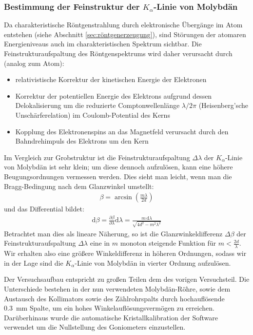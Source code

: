 \documentclass[11pt, a4paper]{article}
\begin{document}
\subsubsection{Bestimmung der Feinstruktur der $K_\alpha$-Linie von Molybdän}
Da charakteristische Röntgenstrahlung durch elektronische Übergänge im Atom entstehen (siehe Abschnitt \ref{sec:röntgenerzeugung}), sind Störungen der atomaren Energieniveaus auch im charakteristischen Spektrum sichtbar.
Die Feinstrukturaufspaltung des Röntgenspektrums wird daher verursacht durch (analog zum Atom):
\begin{itemize}
  \item relativistische Korrektur der kinetischen Energie der Elektronen
  
  \item Korrektur der potentiellen Energie des Elektrons aufgrund dessen Delokalisierung um die reduzierte Comptonwellenlänge $\lambda / 2\pi$ (Heisenberg'sche Unschärferelation) im Coulomb-Potential des Kerns
  
  \item Kopplung des Elektronenspins an das Magnetfeld verursacht durch den Bahndrehimpuls des Elektrons um den Kern
\end{itemize}
Im Vergleich zur Grobstruktur ist die Feinstrukturaufspaltung $\Delta \lambda$ der $K_\alpha$-Linie von Molybdän ist sehr klein; um diese dennoch aufzulösen, kann eine höhere Beugungsordnungen vermessen werden.
Dies sieht man leicht, wenn man die Bragg-Bedingung nach dem Glanzwinkel umstellt:
\begin{align}
  \beta = \arcsin \left( \frac{m \lambda}{2 d} \right)
\end{align}
und das Differential bildet:
\begin{align}
  \mathrm{d}\beta = \frac{\partial \beta}{\partial \lambda} \mathrm{d}\lambda = \frac{m\, \mathrm{d}\lambda}{\sqrt{4 d^2 - m^2 \lambda^2}}
\end{align}
Betrachtet man dies als lineare Näherung, so ist die Glanzwinkeldifferenz $\Delta \beta$ der Feinstrukturaufspaltung $\Delta \lambda$ eine in $m$ monoton steigende Funktion für $m < \frac{2d}{\lambda}$.
Wir erhalten also eine größere Winkeldifferenz in höheren Ordnungen, sodass wir in der Lage sind die $K_\alpha$-Linie von Molybdän in vierter Ordnung aufzulösen.

Der Versuchsaufbau entspricht zu großen Teilen dem des vorigen Versuchsteil.
Die Unterschiede bestehen in der nun verwendeten Molybdän-Röhre, sowie dem Austausch des Kollimators sowie des Zählrohrspalts durch hochauflösende \SI{0,3}{\milli\metre} Spalte, um ein hohes Winkelauflösungsvermögen zu erreichen.
Darüberhinaus wurde die automatische Kristallkalibration der Software verwendet um die Nullstellung des Goniometers einzustellen.
\end{document}
